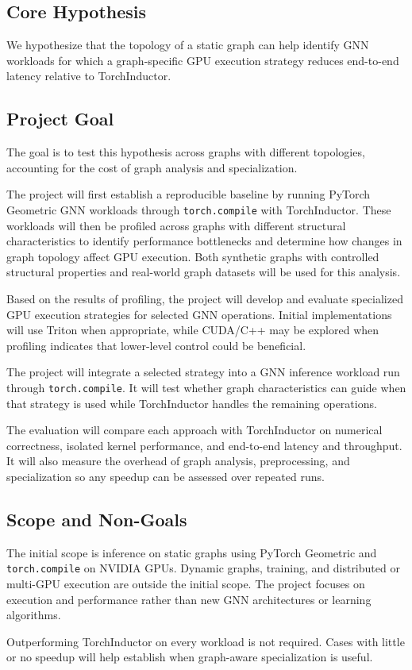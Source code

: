 \subsection{Core Hypothesis}
\label{sec:core-hypothesis}

We hypothesize that the topology of a static graph can help identify GNN workloads for which a graph-specific GPU execution strategy reduces end-to-end latency relative to TorchInductor.

\subsection{Project Goal}
\label{sec:project-goal}

The goal is to test this hypothesis across graphs with different topologies, accounting for the cost of graph analysis and specialization.

The project will first establish a reproducible baseline by running PyTorch Geometric GNN workloads through \texttt{torch.compile} with TorchInductor. These workloads will then be profiled across graphs with different structural characteristics to identify performance bottlenecks and determine how changes in graph topology affect GPU execution. Both synthetic graphs with controlled structural properties and real-world graph datasets will be used for this analysis.

Based on the results of profiling, the project will develop and evaluate specialized GPU execution strategies for selected GNN operations. Initial implementations will use Triton when appropriate, while CUDA/C++ may be explored when profiling indicates that lower-level control could be beneficial.

The project will integrate a selected strategy into a GNN inference workload run through \texttt{torch.compile}. It will test whether graph characteristics can guide when that strategy is used while TorchInductor handles the remaining operations.

The evaluation will compare each approach with TorchInductor on numerical correctness, isolated kernel performance, and end-to-end latency and throughput. It will also measure the overhead of graph analysis, preprocessing, and specialization so any speedup can be assessed over repeated runs.

\subsection{Scope and Non-Goals}
\label{sec:scope-non-goals}

The initial scope is inference on static graphs using PyTorch Geometric and \texttt{torch.compile} on NVIDIA GPUs. Dynamic graphs, training, and distributed or multi-GPU execution are outside the initial scope. The project focuses on execution and performance rather than new GNN architectures or learning algorithms.

Outperforming TorchInductor on every workload is not required. Cases with little or no speedup will help establish when graph-aware specialization is useful.
